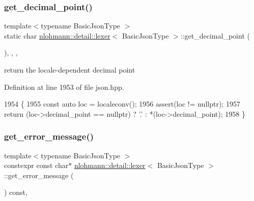\subsubsection{\texorpdfstring{get\+\_\+decimal\+\_\+point()}{get\_decimal\_point()}}
{\footnotesize\ttfamily template$<$typename Basic\+Json\+Type $>$ \\
static char \hyperlink{classnlohmann_1_1detail_1_1lexer}{nlohmann\+::detail\+::lexer}$<$ Basic\+Json\+Type $>$\+::get\+\_\+decimal\+\_\+point (\begin{DoxyParamCaption}{ }\end{DoxyParamCaption})\hspace{0.3cm}{\ttfamily [inline]}, {\ttfamily [static]}, {\ttfamily [private]}, {\ttfamily [noexcept]}}



return the locale-\/dependent decimal point 



Definition at line 1953 of file json.\+hpp.


\begin{DoxyCode}
1954     \{
1955         \textcolor{keyword}{const} \textcolor{keyword}{auto} loc = localeconv();
1956         assert(loc != \textcolor{keyword}{nullptr});
1957         \textcolor{keywordflow}{return} (loc->decimal\_point == \textcolor{keyword}{nullptr}) ? \textcolor{charliteral}{'.'} : *(loc->decimal\_point);
1958     \}
\end{DoxyCode}
\mbox{\label{classnlohmann_1_1detail_1_1lexer_a53cebbc684ef97fa49651eb442d58f86}} 
\subsubsection{\texorpdfstring{get\+\_\+error\+\_\+message()}{get\_error\_message()}}
{\footnotesize\ttfamily template$<$typename Basic\+Json\+Type $>$ \\
constexpr const char$\ast$ \hyperlink{classnlohmann_1_1detail_1_1lexer}{nlohmann\+::detail\+::lexer}$<$ Basic\+Json\+Type $>$\+::get\+\_\+error\+\_\+message (\begin{DoxyParamCaption}{ }\end{DoxyParamCaption}) const\hspace{0.3cm}{\ttfamily [inline]}, {\ttfamily [noexcept]}}



